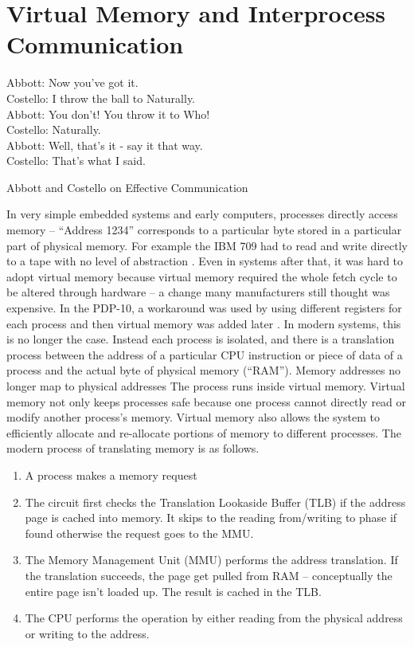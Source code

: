 \chapter{Virtual Memory and Interprocess Communication}

\epigraph{Abbott: Now you've got it. \\
Costello: I throw the ball to Naturally. \\
Abbott: You don't! You throw it to Who! \\
Costello: Naturally. \\
Abbott: Well, that's it - say it that way. \\
Costello: That's what I said.}{Abbott and Costello on Effective Communication}

In very simple embedded systems and early computers, processes directly access memory -- ``Address 1234'' corresponds to a particular byte stored in a particular part of physical memory.
For example the IBM 709 had to read and write directly to a tape with no level of abstraction \cite[P. 65]{ibm709}.
Even in systems after that, it was hard to adopt virtual memory because virtual memory required the whole fetch cycle to be altered through hardware -- a change many manufacturers still thought was expensive.
In the PDP-10, a workaround was used by using different registers for each process and then virtual memory was added later \cite{ricm}.
In modern systems, this is no longer the case.
Instead each process is isolated, and there is a translation process between the address of a particular CPU instruction or piece of data of a process and the actual byte of physical memory (``RAM'').
Memory addresses no longer map to physical addresses
The process runs inside virtual memory.
Virtual memory not only keeps processes safe because one process cannot directly read or modify another process's memory.
Virtual memory also allows the system to efficiently allocate and re-allocate portions of memory to different processes.
The modern process of translating memory is as follows.

\begin{enumerate}
\item A process makes a memory request
\item The circuit first checks the Translation Lookaside Buffer (TLB) if the address page is cached into memory. It skips to the reading from/writing to phase if found otherwise the request goes to the MMU.
\item The Memory Management Unit (MMU) performs the address translation. If the translation succeeds, the page get pulled from RAM -- conceptually the entire page isn't loaded up. The result is cached in the TLB.
\item The CPU performs the operation by either reading from the physical address or writing to the address.
\end{enumerate}

